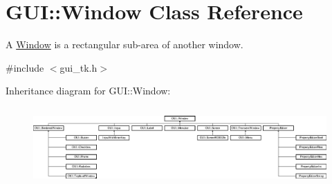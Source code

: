 \hypertarget{classGUI_1_1Window}{\section{G\-U\-I\-:\-:Window Class Reference}
\label{classGUI_1_1Window}
}


A \hyperlink{classGUI_1_1Window}{Window} is a rectangular sub-\/area of another window.  




{\ttfamily \#include $<$gui\-\_\-tk.\-h$>$}

Inheritance diagram for G\-U\-I\-:\-:Window\-:\begin{figure}[H]
\begin{center}
\leavevmode
\includegraphics[height=3.045843cm]{classGUI_1_1Window}
\end{center}
\end{figure}
